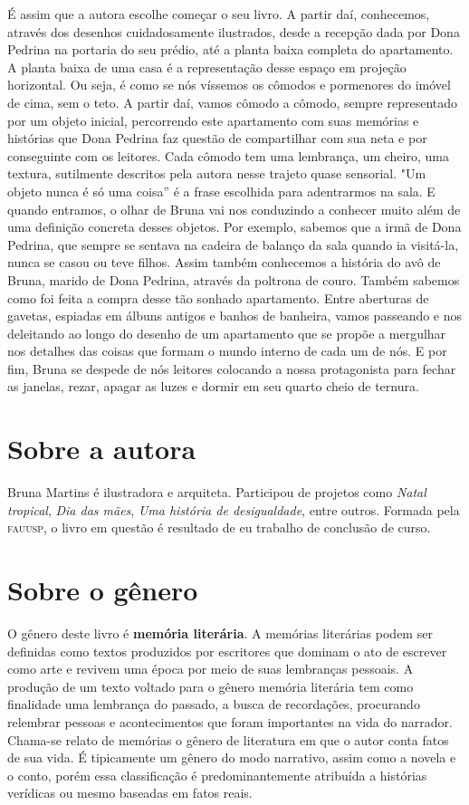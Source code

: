\documentclass[11pt]{extarticle}
\begin{document}
É assim que a autora escolhe começar o seu livro. A partir daí, conhecemos, através dos desenhos cuidadosamente ilustrados, desde a recepção dada por Dona Pedrina na portaria do seu prédio, até a planta baixa completa do apartamento. A planta baixa de uma casa é a representação desse espaço em projeção horizontal. Ou seja, é como se nós víssemos os cômodos e pormenores do imóvel de cima, sem o teto. A partir daí, vamos cômodo a cômodo, sempre representado por um objeto inicial, percorrendo este apartamento com suas memórias e histórias que Dona Pedrina faz questão de compartilhar com sua neta e por conseguinte com os leitores. Cada cômodo tem uma lembrança, um cheiro, uma textura, sutilmente descritos pela autora nesse trajeto quase sensorial. "Um objeto nunca é só uma coisa” é a frase escolhida para adentrarmos na sala. E quando entramos, o olhar de Bruna vai nos conduzindo a conhecer muito além de uma definição concreta desses objetos. Por exemplo, sabemos que a irmã de Dona Pedrina, que sempre se sentava na cadeira de balanço da sala quando ia visitá-la, nunca se casou ou teve filhos. Assim também conhecemos a história do avô de Bruna, marido de Dona Pedrina, através da poltrona de couro. Também sabemos como foi feita a compra desse tão sonhado apartamento. Entre aberturas de gavetas, espiadas em álbuns antigos e banhos de banheira, vamos passeando e nos deleitando ao longo do desenho de um apartamento que se propõe a mergulhar nos detalhes das coisas que formam o mundo interno de cada um de nós. E por fim, Bruna se despede de nós leitores colocando a nossa protagonista para fechar as janelas, rezar, apagar as luzes e dormir em seu quarto cheio de ternura. 

\section{Sobre a autora}

Bruna Martins é ilustradora e arquiteta. Participou de projetos como \textit{Natal tropical}, \textit{Dia das mães}, \textit{Uma história de desigualdade}, entre outros. Formada pela \textsc{fauusp}, o livro em questão é resultado de eu trabalho de conclusão de curso.

\section{Sobre o gênero}

O gênero deste livro é \textbf{memória literária}. A memórias literárias podem ser definidas como textos produzidos por escritores que dominam o ato de escrever como arte e revivem uma época por meio de suas lembranças pessoais. A produção de um texto voltado para o gênero memória literária tem como finalidade uma lembrança do passado, a busca de recordações, procurando relembrar pessoas e acontecimentos que foram importantes na vida do narrador. Chama-se relato de memórias o gênero de literatura em que o autor conta fatos de sua vida. É tipicamente um gênero do modo narrativo, assim como a novela e o conto, porém essa classificação é predominantemente atribuída a histórias verídicas ou mesmo baseadas em fatos reais.
\end{document}
